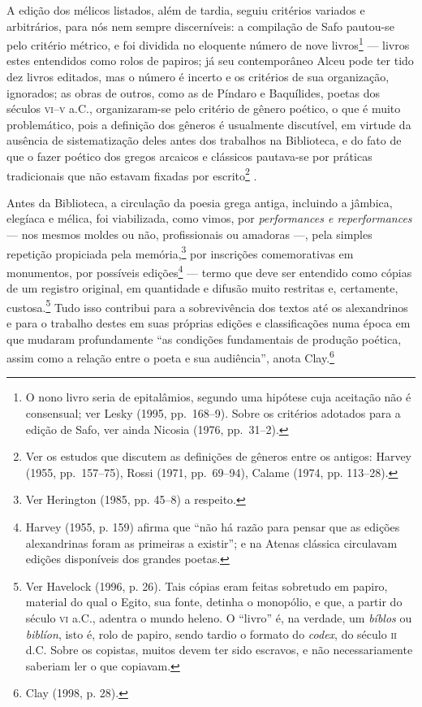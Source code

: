 A edição dos mélicos listados, além de tardia, seguiu critérios variados e
arbitrários, para nós nem sempre discerníveis: a compilação de Safo pautou-se
pelo critério métrico, e foi dividida no eloquente número de nove
livros\footnote{ O nono livro seria de epitalâmios, segundo uma hipótese cuja
aceitação não é consensual; ver Lesky (1995, pp.~168--9). Sobre os critérios
adotados para a edição de Safo, ver ainda Nicosia (1976, pp.~31--2).}  --- livros
estes entendidos como rolos de papiros; já seu contemporâneo Alceu pode ter
tido dez livros editados, mas o número é incerto e os critérios de sua
organização, ignorados; as obras de outros, como as de Píndaro e Baquílides,
poetas dos séculos \textsc{vi}--\textsc{v} a.C., organizaram-se pelo critério de gênero poético, o
que é muito problemático, pois a definição dos gêneros é usualmente discutível,
em virtude da ausência de sistematização deles antes dos trabalhos na
Biblioteca, e do fato de que o fazer poético dos gregos arcaicos e clássicos
pautava-se por práticas tradicionais que não estavam fixadas por
escrito\footnote{ Ver os estudos que discutem as definições de gêneros entre os
antigos: Harvey (1955, pp.~157--75), Rossi (1971, pp.~69--94), Calame (1974, pp.
113--28).} .

Antes da Biblioteca, a circulação da poesia grega antiga, incluindo a jâmbica,
elegíaca e mélica, foi viabilizada, como vimos, por \textit{performances e
reperformances} --- nos mesmos moldes ou não, profissionais ou amadoras ---, pela
simples repetição propiciada pela memória,\footnote{ Ver Herington (1985, pp.
45--8) a respeito.} por inscrições comemorativas em monumentos, por possíveis
edições\footnote{ Harvey (1955, p. 159) afirma que “não há razão para pensar
que as edições alexandrinas foram as primeiras a existir”; e na Atenas clássica
circulavam edições disponíveis dos grandes poetas.} --- termo que deve ser
entendido como cópias de um registro original, em quantidade e difusão muito
restritas e, certamente, custosa.\footnote{ Ver Havelock (1996, p. 26). Tais
cópias eram feitas sobretudo em papiro, material do qual o Egito, sua fonte,
detinha o monopólio, e que, a partir do século \textsc{vi} a.C., adentra o mundo heleno.
O “livro” é, na verdade, um \textit{bíblos} ou \textit{biblíon}, isto é, rolo
de papiro, sendo tardio o formato do \textit{codex}, do século \textsc{ii} d.C. Sobre
os copistas, muitos devem ter sido escravos, e não necessariamente saberiam ler
o que copiavam.} Tudo isso contribui para a sobrevivência dos textos até os
alexandrinos e para o trabalho destes em suas próprias edições e classificações
numa época em que mudaram profundamente “as condições fundamentais de produção
poética, assim como a relação entre o poeta e sua audiência”, anota Clay.\footnote{ Clay (1998, p. 28).} 

